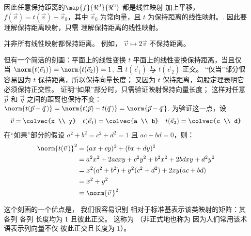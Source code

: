 因此任意保持距离的$\map{f}{\Re^2}{\Re^2}$ 都是线性映射
加上平移，
$f(\vec{v})=t(\vec{v})+\vec{v}_0$，其中 $\vec{v}_0$ 为常向量，且 $t$ 为保持距离的线性映射。.
因此要理解保持距离映射，只需
理解保持距离的线性映射。

并非所有线性映射都保持距离。
例如，
$\vec{v}\mapsto 2\vec{v}$ 不保持距离。

但有一个简洁的刻画：平面上的线性变换 $t$
平面上的线性变换保持距离，当且仅当
$\norm{t(\vec{e}_1)}=\norm{t(\vec{e}_2)}=1$, 
且 $t(\vec{e}_1)$ 与 $t(\vec{e}_2)$ 正交。
“仅当”部分很容易\Dash 因为 $t$
保持距离，所以保持向量长度；
又因为 $t$ 保持距离，勾股定理表明它
必须保持正交性。
证明“如果”部分时，只需验证映射保持向量长度；
这样对任意
$\vec{p}$ 和 $\vec{q}$ 之间的距离也保持不变：
$\norm{t(\vec{p}-\vec{q}\,)}=\norm{t(\vec{p})-t(\vec{q}\,)}
=\norm{\vec{p}-\vec{q}\,}$.
为验证这一点，设
\begin{equation*}
  \vec{v}=\colvec{x \\ y} 
  \quad 
  t(\vec{e}_1)=\colvec{a \\ b}
  \quad
  t(\vec{e}_2)=\colvec{c \\ d}
\end{equation*}
在“如果”部分的假设
$a^2+b^2=c^2+d^2=1$ 且 $ac+bd=0$，则：
\begin{align*}
  \norm{t(\vec{v}\,)}^2
  &= (ax+cy)^2+(bx+dy)^2  \\
  &= a^2x^2+2acxy+c^2y^2+b^2x^2+2bdxy+d^2y^2 \\
  &= x^2(a^2+b^2)+y^2(c^2+d^2)+2xy(ac+bd)  \\
  &= x^2 + y^2 \\
  &= \norm{\vec{v}\,}^2
\end{align*}

这个刻画的一个优点是，
我们很容易识别
相对于标准基表示该类映射的矩阵：其各列
各列
长度均为 1 且彼此正交。
这称为
%
（非正式地也称为
因为人们常用该术语表示列向量不仅
彼此正交且长度为 1）。 

